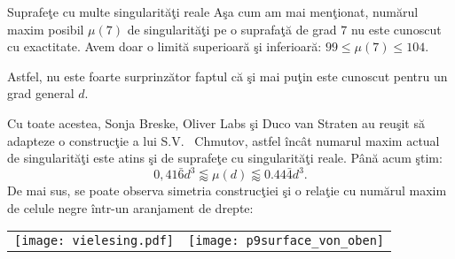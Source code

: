 \begin{surferPage}[216-singularit\u{a}\c{t}i]{Suprafe\c{t}e cu multe singularit\u{a}\c{t}i reale}
   A\c{s}a cum am mai men\c{t}ionat, num\u{a}rul maxim posibil $\mu(7)$ de singularit\u{a}\c{t}i pe o suprafa\c{t}\u{a} de grad $7$ nu este
    cunoscut cu exactitate. Avem doar o limit\u{a} superioar\u{a} \c{s}i inferioar\u{a}: $99 \le \mu(7) \le 104$.

    Astfel, nu este foarte surprinz\u{a}tor faptul c\u{a} \c{s}i mai pu\c{t}in este cunoscut pentru un grad general $d$.
    
    Cu toate acestea, Sonja Breske, Oliver Labs \c{s}i Duco van Straten au reu\c{s}it s\u{a} adapteze o
    construc\c{t}ie a lui S.V. \ Chmutov, astfel \^{i}nc\^{a}t numarul maxim actual de singularit\u{a}\c{t}i este atins \c{s}i de suprafe\c{t}e cu singularit\u{a}\c{t}i 
    reale.
    P\^{a}n\u{a} acum \c{s}tim:
    \[0,41\bar{6}d^3 \lessapprox \mu(d) \lessapprox 0.44\bar{4} d^3.\]
    De mai sus, se poate observa simetria construc\c{t}iei \c{s}i o rela\c{t}ie cu num\u{a}rul maxim de celule negre \^{i}ntr-un aranjament de drepte:
    \begin{center}
      \begin{tabular}{c@{\qquad}c}
        \texttt{[image: vielesing.pdf]}
        &
        \texttt{[image: p9surface\_von\_oben]}
      \end{tabular}
    \end{center}
\end{surferPage}
